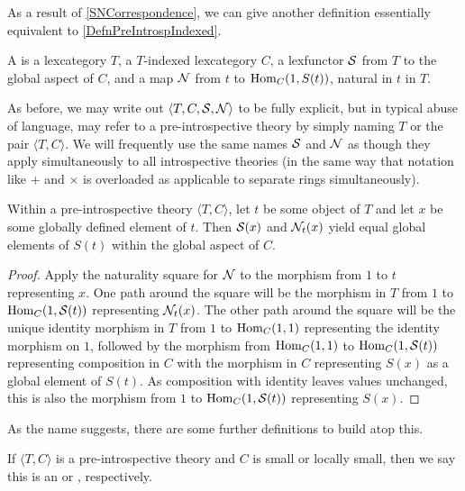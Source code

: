 As a result of \cref{SNCorrespondence}, we can give another definition essentially equivalent to \cref{DefnPreIntrospIndexed}.

\begin{definition}\label{DefnPreIntrospSN}
A  is a lexcategory $T$, a $T$-indexed lexcategory $C$, a lexfunctor $\mathcal{S}$ from $T$ to the global aspect of $C$, and a map $\mathcal{N}$ from $t$ to $\operatorname{Hom}_C(1, S(t))$, natural in $t$ in $T$.
\end{definition}

As before, we may write out $\langle T, C, \mathcal{S}, \mathcal{N} \rangle$ to be fully explicit, but in typical abuse of language, may refer to a pre-introspective theory by simply naming $T$ or the pair $\langle T, C\rangle$. We will frequently use the same names $\mathcal{S}$ and $\mathcal{N}$ as though they apply simultaneously to all introspective theories (in the same way that notation like $+$ and $\times$ is overloaded as applicable to separate rings simultaneously).

\label{SMatchesN}
Within a pre-introspective theory $\langle T, C \rangle$, let $t$ be some object of $T$ and let $x$ be some globally defined element of $t$. Then $\mathcal{S}(x)$ and $\mathcal{N}_t(x)$ yield equal global elements of $S(t)$ within the global aspect of $C$.
\begin{proof}
Apply the naturality square for $\mathcal{N}$ to the morphism from $1$ to $t$ representing $x$. One path around the square will be the morphism in $T$ from $1$ to $\operatorname{Hom}_C(1, \mathcal{S}(t))$ representing $\mathcal{N}_t(x)$. The other path around the square will be the unique identity morphism in $T$ from $1$ to $\operatorname{Hom}_C(1, 1)$ representing the identity morphism on $1$, followed by the morphism from $\operatorname{Hom}_C(1, 1)$ to $\operatorname{Hom}_C(1, \mathcal{S}(t))$ representing composition in $C$ with the morphism in $C$ representing $S(x)$ as a global element of $S(t)$. As composition with identity leaves values unchanged, this is also the morphism from $1$ to $\operatorname{Hom}_C(1, \mathcal{S}(t))$ representing $S(x)$.
\end{proof}

As the name  suggests, there are some further definitions to build atop this.

\begin{definition}\label{DefnIntrosp}
If $\langle T, C \rangle$ is a pre-introspective theory and $C$ is small or locally small, then we say this is an  or , respectively.
\end{definition}

